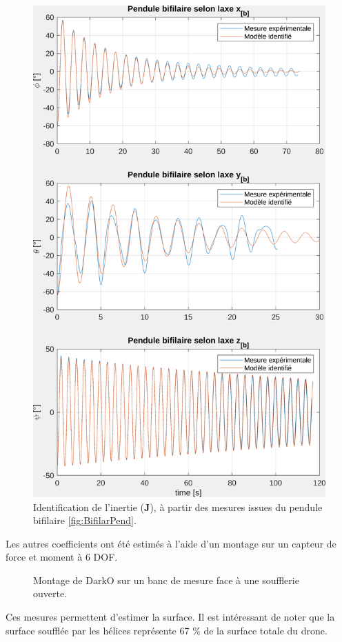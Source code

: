 {    \begin{figure}[ht!]
    \centerline{
    \includegraphics[trim=0cm 0cm 0cm 0cm,clip,width=0.6\columnwidth]{figures/ident_inertia.png}}
    \caption{Identification de l'inertie ($\boldsymbol{J}$), à partir des mesures issues du pendule bifilaire \ref{fig:BifilarPend}.}
    \label{fig:BifilarPend_meas}
    \end{figure}


    
    Les autres coefficients ont été estimés à l'aide d'un montage sur un capteur de force et moment à 6 DOF.
    \begin{figure}[ht!]
        \centering
        \caption{Montage de DarkO sur un banc de mesure face à une soufflerie ouverte.}
        \label{fig:montage_ident}
    \end{figure}
    Ces mesures permettent d'estimer la surface. Il est intéressant de noter que la surface soufflée par les hélices représente 67 \% de la surface totale du drone.
    }

